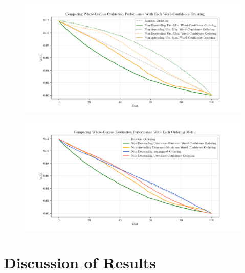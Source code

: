 \begin{figure}[h]
 \includegraphics[width=\textwidth]{figures/corpus-all-word-conf-measures.png}
 \centering
\end{figure}
\begin{figure}[h]
 \includegraphics[width=\textwidth]{figures/corpus-allmeasures.png}
 \centering
\end{figure}

\section{Discussion of Results}
